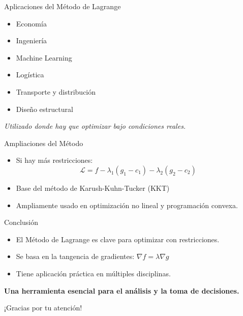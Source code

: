 \documentclass{beamer}
\begin{document}
	\begin{frame}{Aplicaciones del Método de Lagrange}
		\begin{multicols}{2}
			\begin{itemize}
				\item Economía
				\item Ingeniería
				\item Machine Learning
				\item Logística
				\item Transporte y distribución
				\item Diseño estructural
			\end{itemize}
		\end{multicols}
		\vspace{1em}
		\centering
		\textit{Utilizado donde hay que optimizar bajo condiciones reales.}
	\end{frame}
	
	\begin{frame}{Ampliaciones del Método}
		\begin{itemize}
			\item Si hay más restricciones:
			\[
			\mathcal{L} = f - \lambda_1(g_1 - c_1) - \lambda_2(g_2 - c_2)
			\]
			\item Base del método de Karush-Kuhn-Tucker (KKT)
			\item Ampliamente usado en optimización no lineal y programación convexa.
		\end{itemize}
	\end{frame}
	
	\begin{frame}{Conclusión}
		\begin{itemize}
			\item El Método de Lagrange es clave para optimizar con restricciones.
			\item Se basa en la tangencia de gradientes: \( \nabla f = \lambda \nabla g \)
			\item Tiene aplicación práctica en múltiples disciplinas.
		\end{itemize}
		\vspace{1em}
		\centering
		\textbf{Una herramienta esencial para el análisis y la toma de decisiones.}
	\end{frame}
	
	\begin{frame}
		\centering
		\Huge ¡Gracias por tu atención!
	\end{frame}
	
\end{document}
